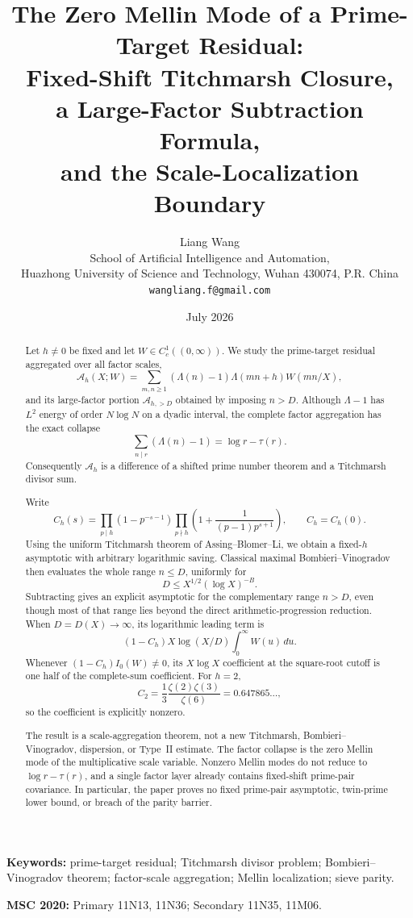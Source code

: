 \documentclass[11pt]{article}
\title{\textbf{The Zero Mellin Mode of a Prime-Target Residual:}\\
\textbf{Fixed-Shift Titchmarsh Closure,}\\
\textbf{a Large-Factor Subtraction Formula,}\\
\textbf{and the Scale-Localization Boundary}}
\author{Liang Wang\\
\small School of Artificial Intelligence and Automation,\\[-0.2em]
\small Huazhong University of Science and Technology, Wuhan 430074, P.R. China\\
\small \texttt{wangliang.f@gmail.com}}
\date{July 2026}
\theoremstyle{definition}
\theoremstyle{remark}
\newcommand{\cA}{\mathcal A}
\begin{document}
\maketitle

\begin{abstract}
Let $h\ne0$ be fixed and let $W\in C_c^1((0,\infty))$.  We study the
prime-target residual aggregated over all factor scales,
\[
 \cA_h(X;W)=
 \sum_{m,n\geq1}(\Lambda(n)-1)\Lambda(mn+h)W(mn/X),
\]
and its large-factor portion $\cA_{h,>D}$ obtained by imposing $n>D$.
Although $\Lambda-1$ has $L^2$ energy of order $N\log N$ on a dyadic
interval, the complete factor aggregation has the exact collapse
\[
 \sum_{n\mid r}(\Lambda(n)-1)=\log r-\tau(r).
\]
Consequently $\cA_h$ is a difference of a shifted prime number theorem and
a Titchmarsh divisor sum.

Write
\[
 C_h(s)=
 \prod_{p\mid h}(1-p^{-s-1})
 \prod_{p\nmid h}\left(1+\frac1{(p-1)p^{s+1}}\right),
 \qquad C_h=C_h(0).
\]
Using the uniform Titchmarsh theorem of Assing--Blomer--Li, we obtain a
fixed-$h$ asymptotic with arbitrary logarithmic saving.  Classical maximal
Bombieri--Vinogradov then evaluates the whole range $n\leq D$, uniformly for
\[
 D\leq X^{1/2}(\log X)^{-B}.
\]
Subtracting gives an explicit asymptotic for the complementary range
$n>D$, even though most of that range lies beyond the direct
arithmetic-progression reduction.  When $D=D(X)\to\infty$, its logarithmic
leading term is
\[
 (1-C_h)X\log(X/D)\int_0^\infty W(u)\,du.
\]
Whenever $(1-C_h)I_0(W)\ne0$, its $X\log X$ coefficient at the
square-root cutoff is one half of the complete-sum coefficient.  For $h=2$,
\[
 C_2=\frac13\frac{\zeta(2)\zeta(3)}{\zeta(6)}
 =0.647865\ldots,
\]
so the coefficient is explicitly nonzero.

The result is a scale-aggregation theorem, not a new Titchmarsh,
Bombieri--Vinogradov, dispersion, or Type~II estimate.  The factor collapse
is the zero Mellin mode of the multiplicative scale variable.  Nonzero
Mellin modes do not reduce to $\log r-\tau(r)$, and a single factor layer
already contains fixed-shift prime-pair covariance.  In particular, the
paper proves no fixed prime-pair asymptotic, twin-prime lower bound, or
breach of the parity barrier.
\end{abstract}

\noindent\textbf{Keywords:} prime-target residual; Titchmarsh divisor
problem; Bombieri--Vinogradov theorem; factor-scale aggregation; Mellin
localization; sieve parity.

\medskip
\noindent\textbf{MSC 2020:} Primary 11N13, 11N36; Secondary 11N35, 11M06.









\end{document}
